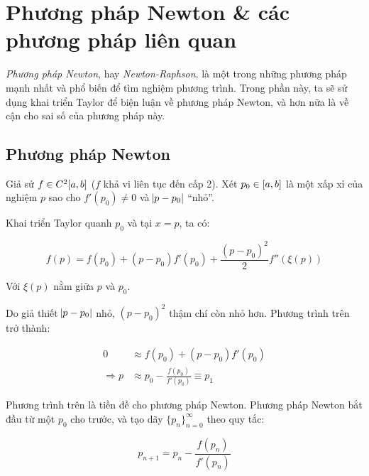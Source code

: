 \documentclass[../../Lectures]{subfiles}
\begin{document}

\section{Phương pháp Newton \& các phương pháp liên quan}

\emph{Phương pháp Newton}, hay \emph{Newton-Raphson}, là một trong những phương
pháp mạnh nhất và phổ biến để tìm nghiệm phương trình. Trong phần này, ta sẽ sử
dụng khai triển Taylor để biện luận về phương pháp Newton, và hơn nữa là về cận
cho sai số của phương pháp này.

\subsection{Phương pháp Newton}\label{sec:newton_method}

Giả sử \(f \in C^2\interval{a}{b}\) (\(f\) khả vi liên tục đến cấp 2). Xét \(p_0
\in \interval{a}{b}\) là một xấp xỉ của nghiệm \(p\) sao cho \(f'(p_0) \neq 0\)
và \(\abs{p - p_0}\) ``nhỏ''.

Khai triển Taylor quanh \(p_0\) và tại \(x = p\), ta có:

\[f(p) = f(p_0) + (p - p_0) f'(p_0) + \frac{(p - p_0)^2}{2} f''(\xi(p))\]

Với \(\xi(p)\) nằm giữa \(p\) và \(p_0\).

Do giả thiết \(\abs{p - p_0}\) nhỏ, \((p - p_0)^2\) thậm chí còn nhỏ hơn. Phương
trình trên trở thành:

\begin{align*}
                0 & \approx f(p_0) + (p - p_0) f'(p_0) \\
    \Rightarrow	p & \approx p_0 - \frac{f(p_0)}{f'(p_0)} \equiv p_1
\end{align*}

Phương trình trên là tiền đề cho phương pháp Newton. Phương pháp Newton bắt đầu
từ một \(p_0\) cho trước, và tạo dãy \(\{p_n\}_{n = 0}^\infty\) theo quy tắc:

\begin{equation}\label{eq:newton_sequence_function}
    p_{n + 1} = p_n - \frac{f(p_n)}{f'(p_n)}
\end{equation}

\end{document}
